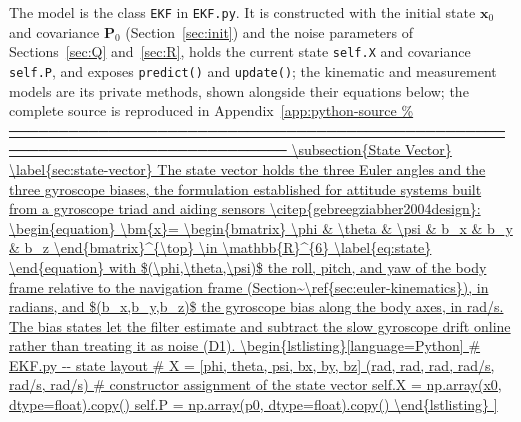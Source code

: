 \documentclass[12pt,a4paper]{article}
\newcommand{\bx}{\bm{x}}
\newcommand{\bP}{\bm{P}}
\begin{document}
The model is the class \texttt{EKF} in \texttt{EKF.py}. It is
constructed with the initial state $\bx_0$ and covariance $\bP_0$
(Section~\ref{sec:init}) and the noise parameters of
Sections~\ref{sec:Q} and~\ref{sec:R}, holds the current state
\texttt{self.X} and covariance \texttt{self.P}, and exposes
\texttt{predict()} and \texttt{update()}; the kinematic and
measurement models are its private methods, shown alongside their equations below; the complete source is reproduced in Appendix~\ref{app:python-source

\subsection{State Vector}
\label{sec:state-vector}

The state vector holds the three Euler angles and the three gyroscope
biases, the formulation established for attitude systems built from
a gyroscope triad and aiding sensors
\citep{gebreegziabher2004design}:
\begin{equation}
  \bx = \begin{bmatrix} \phi & \theta & \psi & b_x & b_y & b_z
        \end{bmatrix}^{\top} \in \mathbb{R}^{6}
  \label{eq:state}
\end{equation}
with $(\phi,\theta,\psi)$ the roll, pitch, and yaw of the body frame
relative to the navigation frame (Section~\ref{sec:euler-kinematics}), in
radians, and $(b_x,b_y,b_z)$ the gyroscope bias along the body axes,
in rad/s. The bias states let the filter estimate and subtract the
slow gyroscope drift online rather than treating it as noise (D1).

\begin{lstlisting}[language=Python]
# EKF.py -- state layout
# X = [phi, theta, psi, bx, by, bz]   (rad, rad, rad, rad/s, rad/s, rad/s)
# constructor assignment of the state vector
self.X = np.array(x0, dtype=float).copy()
self.P = np.array(p0, dtype=float).copy()
\end{lstlisting}

}
\end{document}
